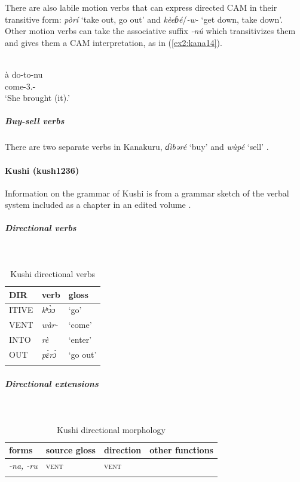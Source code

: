 There are also labile motion verbs that can express directed CAM in their transitive form: \textit{pòrí} `take out, go out' and \textit{kèeɓé}/\textit{-w-} `get down, take down'. Other motion verbs can take the associative suffix \textit{-nú} which transitivizes them and gives them a CAM interpretation, as in (\ref{ex2:kana14}).

\ea\label{ex2:kana14}
 \\
\gll  à do-to-nu \\
 come-3.- \\
\glt `She brought (it).'
\z 

\subparagraph{Buy-sell verbs}



There are two separate verbs in Kanakuru, \textit{ɗìbəré} `buy' and \textit{wùpé} `sell' \citep[124, 134]{newmanKanakuruLanguage1974}.

\paragraph*{Kushi (kush1236)} \label{kush}

Information on the grammar of Kushi is from a grammar sketch of the verbal system included as a chapter in an edited volume \citep{baticVerbClassesTAM2019}.

\subparagraph{Directional verbs}~

\begin{table}[H]
	\caption{Kushi directional verbs} 
	\label{tab:kushV}
	\begin{tabular}{lll} %
		\lsptoprule
		DIR & verb & gloss   \\ %
		\midrule
		ITIVE & \textit{kʰɔ̀ɔ} & `go' \\
		VENT & \textit{wàr-} & `come' \\
		INTO& \textit{rè} & `enter' \\
		OUT & \textit{pɛ̀rɔ̀} & `go out' \\
		\lspbottomrule
	\end{tabular}
\end{table}

\newpage
\subparagraph{Directional extensions}~

\begin{table}[H]
	\caption{Kushi directional morphology}
	\label{tab:kush}
	\begin{tabular}{llll} %
		\lsptoprule
		forms & source gloss & direction  & other functions \\ %
		\midrule
		\textit{-na, -ru}  &  \textsc{vent}  &  \textsc{vent} &     \\
		\lspbottomrule
	\end{tabular}
\end{table} 

